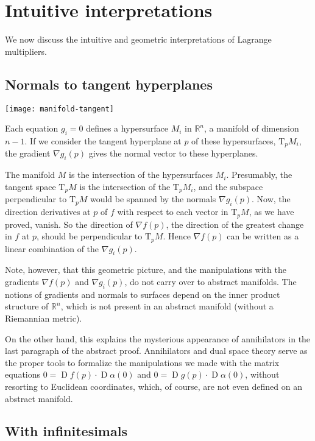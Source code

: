 \documentclass[12pt]{article}
\newcommand{\real}{\mathbb{R}}
\DeclareMathOperator{\D}{D}
\newcommand{\Tp}{\mathrm{T}_p}
\begin{document}
\section{Intuitive interpretations}

We now discuss the intuitive and geometric
interpretations of Lagrange multipliers.

\subsection{Normals to tangent hyperplanes}

\begin{center}
\texttt{[image: manifold-tangent]}
\end{center}

Each equation $g_i = 0$ defines a hypersurface $M_i$ in $\real^n$, a manifold of dimension $n-1$.
If we consider the tangent hyperplane at $p$ of these hypersurfaces, $\Tp M_i$, the gradient $\nabla g_i(p)$
gives the normal vector to these hyperplanes.  

The manifold $M$ is the intersection of the hypersurfaces $M_i$.
Presumably, the tangent space $\Tp M$ is the intersection of the $\Tp M_i$, and the subspace perpendicular to $\Tp M$ would be spanned by the normals $\nabla g_i(p)$.  
Now, the direction derivatives at $p$ of $f$ with respect to each vector in $\Tp M$, as we have proved,
vanish.  So the direction of $\nabla f(p)$, the direction
of the greatest change in $f$ at $p$, should be perpendicular 
to $\Tp M$.  Hence $\nabla f(p)$ can be written as a linear combination of the $\nabla g_i(p)$.


Note, however, that this geometric picture, and the manipulations with the gradients $\nabla f(p)$
and $\nabla g_i(p)$, do not carry over to abstract manifolds.
The notions of gradients and normals to surfaces depend on the 
inner product structure of $\real^n$, which is 
not present in an abstract manifold (without a Riemannian metric).  

On the other hand, this explains the mysterious appearance of annihilators in 
the last paragraph of the abstract proof.
Annihilators and dual space theory serve as the proper tools
to formalize the manipulations we made with the matrix equations $0 = \D f(p) \cdot \D \alpha(0)$ and $0 = \D g(p) \cdot \D \alpha(0)$, without resorting to Euclidean coordinates, which, of course, are not even defined on an abstract manifold.

\subsection{With infinitesimals}
\end{document}
